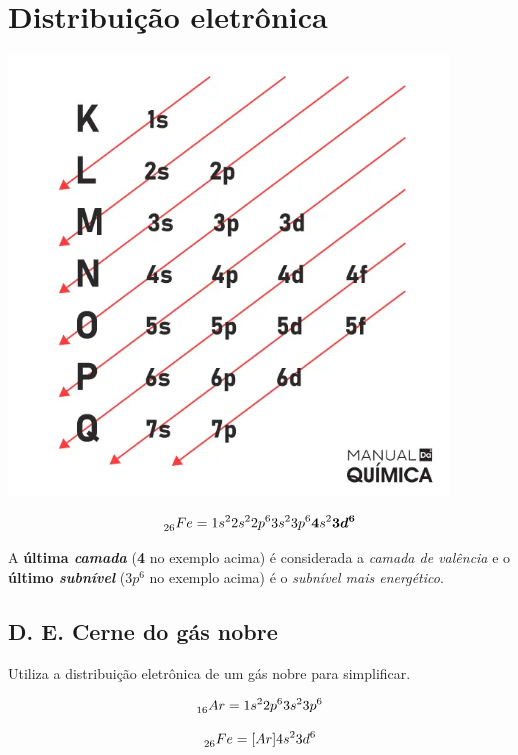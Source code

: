 \documentclass{article}
\begin{document}
\section{Distribuição eletrônica}
\begin{center}
    \includegraphics[width=0.875\textwidth]{distribuicao_eletronica}
\end{center}
\begin{equation}
    \prescript{}{26}{Fe} = 1s^2 2s^2 2p^6 3s^2 3p^6 \boldsymbol{4}s^2 \boldsymbol{3d^6}
\end{equation}

A \textbf{última \emph{camada}} (\textbf{4} no exemplo acima) é considerada a \emph{camada de valência} e o \textbf{último \emph{subnível}} (\textbf{$ 3p^6 $} no exemplo acima) é o \emph{subnível mais energético}.

\subsection{D. E. Cerne do gás nobre}
Utiliza a distribuição eletrônica de um gás nobre para simplificar.

\begin{equation}
    \prescript{}{16}{Ar} = 1s^2 2p^6 3s^2 3p^6
\end{equation}

\begin{equation}
    \prescript{}{26}{Fe} = [Ar]4s^2 3d^6
\end{equation}
\end{document}
